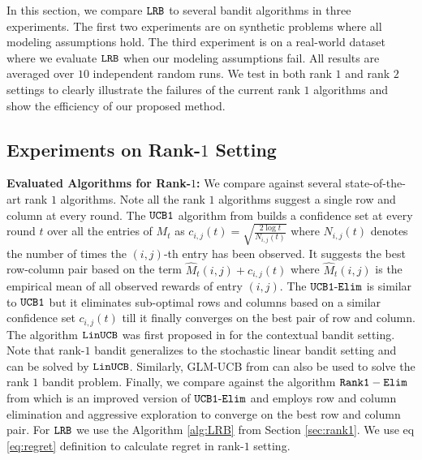 In this section, we compare ${\tt LRB}$ to several bandit algorithms in three experiments. The first two experiments are on synthetic problems where all modeling assumptions hold. The third experiment is on a real-world dataset where we evaluate ${\tt LRB}$ when our modeling assumptions fail. All results are averaged over $10$ independent random runs. We test in both rank $1$ and rank $2$ settings to clearly illustrate the failures of the current rank $1$ algorithms and show the efficiency of our proposed method. 



\subsection{Experiments on Rank-$1$ Setting}

\textbf{Evaluated Algorithms for Rank-$1$:} We compare against several state-of-the-art rank $1$ algorithms. Note all the rank $1$ algorithms suggest a single row and column at every round. The ${\tt UCB1}$ algorithm from \citet{auer2002finite} builds a confidence set at every round $t$ over all the entries of $M_t$ as $c_{i, j}(t) = \sqrt{\frac{2\log t}{N_{i, j}(t)}}$ where $N_{i, j}(t)$ denotes the number of times the $(i,j)$-th entry has been observed. It suggests the best row-column pair based on the term $\hat{M}_{t}(i,j) + c_{i, j}(t)$ where $\hat{M}_{t}(i,j)$ is the empirical mean of all observed rewards of entry $(i,j)$. The ${\tt UCB1\mbox{-}Elim}$ \citep{auer2010ucb} is similar to ${\tt UCB1}$ but it eliminates sub-optimal rows and columns  based on a similar confidence set  $c_{i, j}(t)$ till it finally converges on the best pair of row and column. The algorithm ${\tt LinUCB}$ was first proposed in \citet{li2010contextual} for the contextual bandit setting. Note that rank-$1$ bandit generalizes to the stochastic linear bandit setting and can be solved by ${\tt LinUCB}$. Similarly, GLM-UCB from \citet{filippi2010parametric} can also be used to solve the rank $1$ bandit problem. Finally, we compare against the algorithm $\tt Rank1-Elim$ from \citet{katariya2016stochastic} which is an improved version of ${\tt UCB1\mbox{-}Elim}$ and employs row and column elimination and aggressive exploration to converge on the best row and column pair. For ${\tt LRB}$ we use the Algorithm \ref{alg:LRB} from Section \ref{sec:rank1}. We use eq \eqref{eq:regret} definition to calculate regret in rank-$1$ setting.

